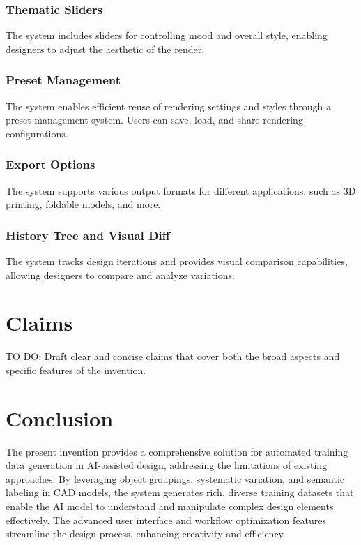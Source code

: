 \documentclass{article}
\begin{document}
\subsubsection{Thematic Sliders}
The system includes sliders for controlling mood and overall style, enabling designers to adjust the aesthetic of the render.

\subsubsection{Preset Management}
The system enables efficient reuse of rendering settings and styles through a preset management system. Users can save, load, and share rendering configurations.

\subsubsection{Export Options}
The system supports various output formats for different applications, such as 3D printing, foldable models, and more.

\subsubsection{History Tree and Visual Diff}
The system tracks design iterations and provides visual comparison capabilities, allowing designers to compare and analyze variations.

\section{Claims}

TO DO: Draft clear and concise claims that cover both the broad aspects and specific features of the invention.

\section{Conclusion}

The present invention provides a comprehensive solution for automated training data generation in AI-assisted design, addressing the limitations of existing approaches. By leveraging object groupings, systematic variation, and semantic labeling in CAD models, the system generates rich, diverse training datasets that enable the AI model to understand and manipulate complex design elements effectively. The advanced user interface and workflow optimization features streamline the design process, enhancing creativity and efficiency.
\end{document}

